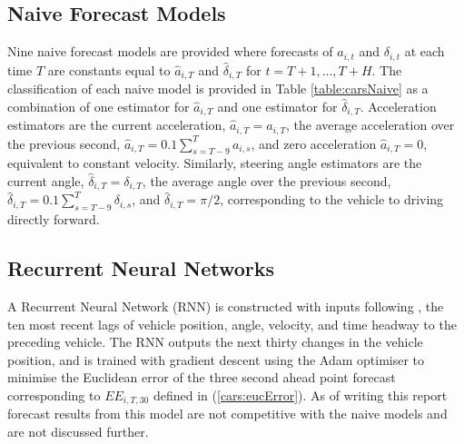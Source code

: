 \documentclass[
12pt, %
onehalfspacing, %
nohyperref, %
headsepline, %
chapterinoneline, %
]{MastersDoctoralThesis} %
\begin{document}
\subsection{Naive Forecast Models}
\label{subsec:carsNaive}

Nine naive forecast models are provided where forecasts of $a_{i, t}$ and $\delta_{i, t}$ at each time $T$ are constants equal to $\hat{a}_{i, T}$ and $\hat{\delta}_{i, T}$ for $t = T+1, \ldots, T+H$. The classification of each naive model is provided in Table \ref{table:carsNaive} as a combination of one estimator for $\hat{a}_{i, T}$ and one estimator for $\hat{\delta}_{i, T}$. Acceleration estimators are the current acceleration, $\hat{a}_{i, T} = a_{i, T}$, the average acceleration over the previous second, $\hat{a}_{i, T} = 0.1 \sum_{s = T-9}^T a_{i, s}$, and zero acceleration $\hat{a}_{i, T} = 0$, equivalent to constant velocity. Similarly, steering angle estimators are the current angle, $\hat{\delta}_{i, T} = \delta_{i, T}$, the average angle over the previous second, $\hat{\delta}_{i, T} = 0.1 \sum_{s = T - 9}^T \delta_{i, s}$, and $\hat{\delta}_{i, T} = \pi/2$, corresponding to the vehicle to driving directly forward.
\begin{table}
\begin{center}
\end{center}
\caption{Classification of naive forecast models by future acceleration and steering angle estimators.}
\label{table:carsNaive}
\end{table}

\subsection{Recurrent Neural Networks}
\label{subsec:carsRNN}
A Recurrent Neural Network (RNN) is constructed with inputs following \citet{Ding2013}, the ten most recent lags of vehicle position, angle, velocity, and time headway to the preceding vehicle. The RNN outputs the next thirty changes in the vehicle position, and is trained with gradient descent using the Adam optimiser to minimise the Euclidean error of the three second ahead point forecast corresponding to $EE_{i, T, 30}$ defined in (\ref{cars:eucError}). As of writing this report forecast results from this model are not competitive with the naive models and are not discussed further.
\end{document}
